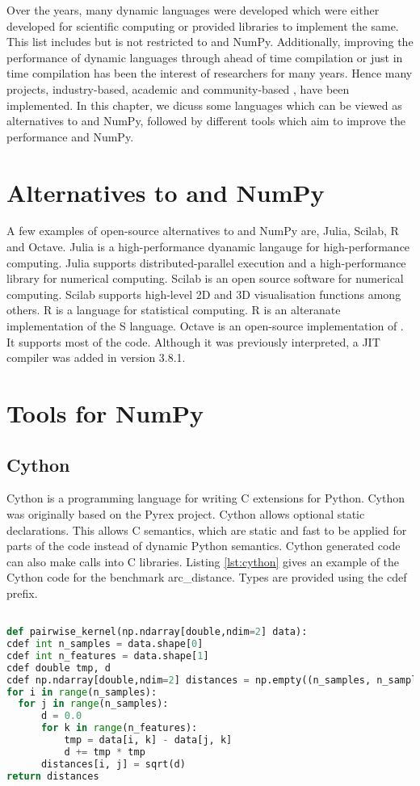 Over the years, many dynamic languages were developed which were either developed for scientific computing or provided libraries to implement the same. This list includes but is not restricted to \matlab and NumPy. Additionally, improving the performance of dynamic languages through ahead of time compilation or just in time compilation has been the interest of researchers for many years. Hence many projects, industry-based, academic and community-based , have been implemented. In this chapter, we dicuss some languages which can be viewed as alternatives to \matlab and NumPy, followed by different tools which aim to improve the performance \matlab and NumPy.
\section{Alternatives to \matlab and NumPy}
A few examples of open-source alternatives to \matlab and NumPy are, Julia\cite{julia}, Scilab\cite{scilab}, R\cite{rlang} and Octave\cite{octave}. Julia is a high-performance dyanamic langauge for high-performance computing. Julia supports distributed-parallel execution and a high-performance library for numerical computing. Scilab is an open source software for numerical computing. Scilab supports high-level 2D and 3D visualisation functions among others. R is a language for statistical computing. R is an alteranate implementation of the S language. Octave is an open-source implementation of \matlab. It supports most of the \matlab code. Although it was previously interpreted, a JIT compiler was added in version 3.8.1.
\section{Tools for NumPy}
\subsection{Cython}
Cython is a programming language for writing C extensions for Python. Cython was originally based on the Pyrex project\cite{pyrex}.  Cython allows optional static declarations. This allows C semantics, which are static and fast to be applied for parts of the code instead of dynamic Python semantics. Cython generated code can also make calls into C libraries. Listing \ref{lst:cython} gives an example of the Cython code for the benchmark arc\_distance. Types are provided using the \textsf{cdef} prefix. 

\begin{lstlisting}[language=python, label={lst:cython}, caption={ The Cython code with static type annotations that will is taken as input by Cython to generate C code. The example is of the arc\_distance benchmark}]

def pairwise_kernel(np.ndarray[double,ndim=2] data):
cdef int n_samples = data.shape[0]
cdef int n_features = data.shape[1]
cdef double tmp, d
cdef np.ndarray[double,ndim=2] distances = np.empty((n_samples, n_samples))
for i in range(n_samples):
  for j in range(n_samples):
	  d = 0.0
	  for k in range(n_features):
		  tmp = data[i, k] - data[j, k]
		  d += tmp * tmp
	  distances[i, j] = sqrt(d)
return distances
\end{lstlisting}

